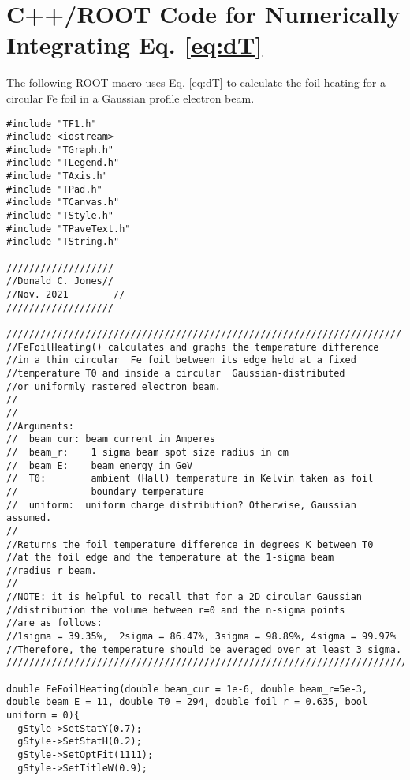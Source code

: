 \documentclass[12pt]{article}
\begin{document}
\section{C++/ROOT Code for Numerically Integrating Eq. \ref{eq:dT}}
The following ROOT macro uses Eq. \ref{eq:dT} to calculate the foil heating for a circular Fe foil in a Gaussian profile electron beam.
\begin{lstlisting}
#include "TF1.h"
#include <iostream>
#include "TGraph.h"
#include "TLegend.h"
#include "TAxis.h"
#include "TPad.h"
#include "TCanvas.h"
#include "TStyle.h"
#include "TPaveText.h"
#include "TString.h"

///////////////////
//Donald C. Jones//
//Nov. 2021        //
///////////////////

//////////////////////////////////////////////////////////////////////
//FeFoilHeating() calculates and graphs the temperature difference 
//in a thin circular  Fe foil between its edge held at a fixed 
//temperature T0 and inside a circular  Gaussian-distributed 
//or uniformly rastered electron beam.                                                 
//     
//                                                                               
//Arguments:                                                                         
//  beam_cur: beam current in Amperes                                                
//  beam_r:    1 sigma beam spot size radius in cm                                    
//  beam_E:    beam energy in GeV                                                      
//  T0:        ambient (Hall) temperature in Kelvin taken as foil 
//             boundary temperature 
//  uniform:  uniform charge distribution? Otherwise, Gaussian assumed. 
//                                                                         
//Returns the foil temperature difference in degrees K between T0
//at the foil edge and the temperature at the 1-sigma beam 
//radius r_beam.       
//                       
//NOTE: it is helpful to recall that for a 2D circular Gaussian 
//distribution the volume between r=0 and the n-sigma points 
//are as follows:                           
//1sigma = 39.35%,  2sigma = 86.47%, 3sigma = 98.89%, 4sigma = 99.97%
//Therefore, the temperature should be averaged over at least 3 sigma.    
/////////////////////////////////////////////////////////////////////////

double FeFoilHeating(double beam_cur = 1e-6, double beam_r=5e-3, double beam_E = 11, double T0 = 294, double foil_r = 0.635, bool uniform = 0){
  gStyle->SetStatY(0.7);
  gStyle->SetStatH(0.2);
  gStyle->SetOptFit(1111);
  gStyle->SetTitleW(0.9);



\end{lstlisting}
\end{document}
